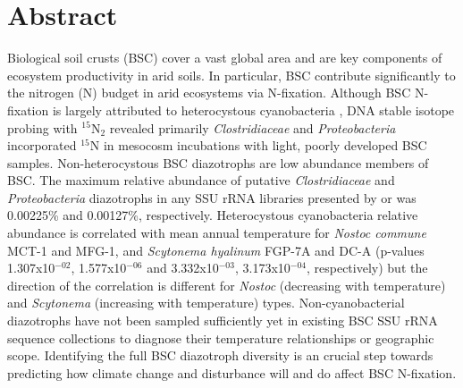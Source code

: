 \section{Abstract}
Biological soil crusts (BSC) cover a vast global area and are key components of ecosystem productivity in arid soils. In particular, BSC contribute significantly to the nitrogen (N) budget in arid ecosystems via N-fixation. Although BSC N-fixation is largely attributed to heterocystous cyanobacteria \citep{Yeager, 14766579, Yeager_2012}, DNA stable isotope probing with $^{15}$N$_{2}$ revealed primarily \textit{Clostridiaceae} and \textit{Proteobacteria} incorporated $^{15}$N in mesocosm incubations with light, poorly developed BSC samples. Non-heterocystous BSC diazotrophs are low abundance members of BSC. The maximum relative abundance of putative \textit{Clostridiaceae} and \textit{Proteobacteria} diazotrophs in any SSU rRNA libraries presented by \citet{Garcia_Pichel_2013} or \citet{Steven_2013} was 0.00225\% and 0.00127\%, respectively. Heterocystous cyanobacteria relative abundance is correlated with mean annual temperature for \textit{Nostoc commune} MCT-1 and MFG-1, and \textit{Scytonema hyalinum} FGP-7A and DC-A (p-values 1.307x10$^{-02}$, 1.577x10$^{-06}$ and 3.332x10$^{-03}$, 3.173x10$^{-04}$, respectively) but the direction of the correlation is different for \textit{Nostoc} (decreasing with temperature) and \textit{Scytonema} (increasing with temperature) types. Non-cyanobacterial diazotrophs have not been sampled sufficiently yet in existing BSC SSU rRNA sequence collections to diagnose their temperature relationships or geographic scope. Identifying the full BSC diazotroph diversity is an crucial step towards predicting how climate change and disturbance will and do affect BSC N-fixation.
